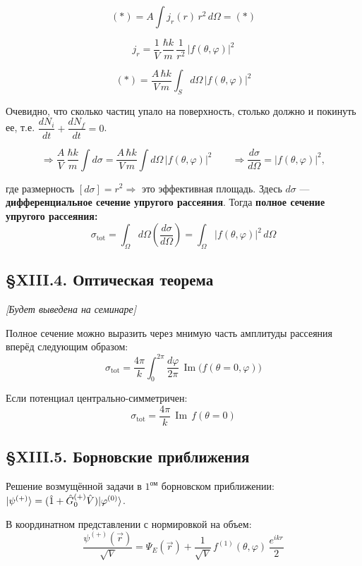 \[
(*) =  A\int j_r(r)\,r^2\,d\Omega = (*)
\]

\[
j_r = \frac{1}{V}\,\frac{\hbar k}{m}\,\frac{1}{r^2}\,|f(\theta,\varphi)|^2
\]

\[
(*) = \frac{A\,\hbar k}{V\,m}\int_S d\Omega\,|f(\theta,\varphi)|^2
\]

Очевидно, что сколько частиц упало на поверхность, столько должно и покинуть ее, т.е. $\dfrac{dN_i}{dt} + \dfrac{dN_f}{dt} = 0$.

\[
\Rightarrow \frac{A}{V}\,\frac{\hbar k}{m}\int d\sigma = \frac{A\,\hbar k}{V\,m}\int d\Omega\,|f(\theta,\varphi)|^2
\qquad \Rightarrow \frac{d\sigma}{d\Omega} = |f(\theta,\varphi)|^2,
\]

где размерность $[d\sigma] = r^2 \Rightarrow$ это эффективная площадь. Здесь $d\sigma$ --- \textbf{дифференциальное сечение упругого рассеяния}. Тогда \textbf{полное сечение упругого рассеяния:}
\[
\sigma_{\text{tot}} = \int_\Omega d\Omega\left(\frac{d\sigma}{d\Omega}\right) = \int_\Omega |f(\theta,\varphi)|^2\,d\Omega
\]



\subsection{\S XIII.4. Оптическая теорема}

\begin{theorem}
	[оптическая] \emph{[Будет выведена на семинаре]}
	
	Полное сечение можно выразить через мнимую часть амплитуды рассеяния вперёд следующим образом:
	\[
	\sigma_{\text{tot}} = \frac{4\pi}{k}\int_0^{2\pi}\frac{d\varphi}{2\pi}\,\operatorname{Im}\bigl(f(\theta=0, \varphi)\bigr)
	\]
	
	Если потенциал центрально-симметричен:
	\[
	\sigma_{\text{tot}} = \frac{4\pi}{k}\,\operatorname{Im}\,f(\theta=0)
	\]
\end{theorem}


\subsection{\S XIII.5. Борновские приближения}

Решение возмущённой задачи в $1^\text{ом}$ борновском приближении: $| \psi^{(+)} \rangle = (\hat{1} + \hat{G}_0^{(+)}\hat{V})| \varphi^{(0)} \rangle$.

В координатном представлении с нормировкой на объем:
\[
\frac{\psi^{(+)}(\vec{r})}{\sqrt{V}} = \Psi_E(\vec{r}) + \frac{1}{\sqrt{V}}\,f^{(1)}(\theta,\varphi)\,\frac{e^{ikr}}{2}
\]

